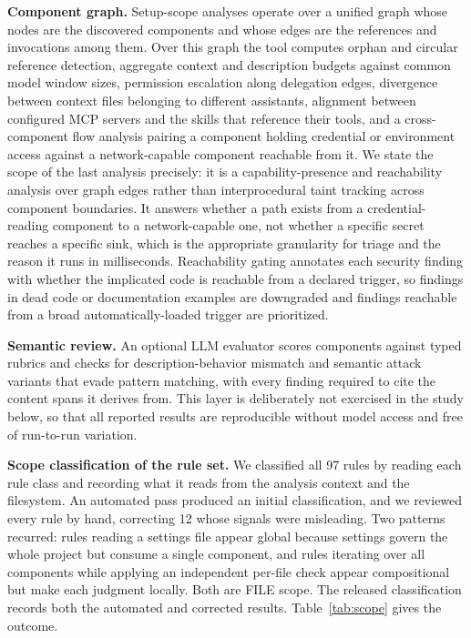 \documentclass[conference]{IEEEtran}
\begin{document}
\textbf{Component graph.} Setup-scope analyses operate over a unified graph
whose nodes are the discovered components and whose edges are the references and
invocations among them. Over this graph the tool computes orphan and circular
reference detection, aggregate context and description budgets against common
model window sizes, permission escalation along delegation edges, divergence
between context files belonging to different assistants, alignment between
configured MCP servers and the skills that reference their tools, and a
cross-component flow analysis pairing a component holding credential or
environment access against a network-capable component reachable from it. We
state the scope of the last analysis precisely: it is a capability-presence and
reachability analysis over graph edges rather than interprocedural taint tracking
across component boundaries. It answers whether a path exists from a
credential-reading component to a network-capable one, not whether a specific
secret reaches a specific sink, which is the appropriate granularity for triage
and the reason it runs in milliseconds. Reachability gating annotates each
security finding with whether the implicated code is reachable from a declared
trigger, so findings in dead code or documentation examples are downgraded and
findings reachable from a broad automatically-loaded trigger are prioritized.

\textbf{Semantic review.} An optional LLM evaluator scores components against
typed rubrics and checks for description-behavior mismatch and semantic attack
variants that evade pattern matching, with every finding required to cite the
content spans it derives from. This layer is deliberately not exercised in the
study below, so that all reported results are reproducible without model access
and free of run-to-run variation.

\textbf{Scope classification of the rule set.} We classified all 97 rules by
reading each rule class and recording what it reads from the analysis context
and the filesystem. An automated pass produced an initial classification, and we
reviewed every rule by hand, correcting 12 whose signals were misleading. Two
patterns recurred: rules reading a settings file appear global because settings
govern the whole project but consume a single component, and rules iterating
over all components while applying an independent per-file check appear
compositional but make each judgment locally. Both are FILE scope. The released
classification records both the automated and corrected results.
Table~\ref{tab:scope} gives the outcome.
\end{document}
